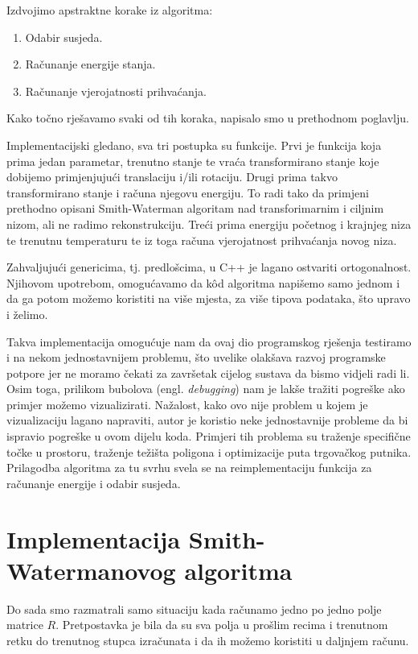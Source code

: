 \documentclass[times, utf8, zavrsni]{fer}
\begin{document}
Izdvojimo apstraktne korake iz algoritma:
\begin{enumerate}
\item 
Odabir susjeda.

\item
Računanje energije stanja.

\item
Računanje vjerojatnosti prihvaćanja.
\end{enumerate}
Kako točno rješavamo svaki od tih koraka, napisalo smo u
prethodnom poglavlju. 

Implementacijski gledano, sva tri postupka su funkcije.
Prvi je funkcija koja prima jedan parametar, trenutno stanje
te vraća transformirano stanje koje dobijemo primjenjujući
translaciju i/ili rotaciju.
Drugi prima takvo transformirano stanje i računa njegovu
energiju. To radi tako da primjeni prethodno opisani
Smith-Waterman algoritam nad transforimarnim i ciljnim
nizom, ali ne radimo rekonstrukciju. 
Treći prima energiju početnog i krajnjeg niza te trenutnu
temperaturu te iz toga računa vjerojatnost prihvaćanja
novog niza. 

Zahvaljujući genericima, tj. predlošcima, u C++ je lagano
ostvariti ortogonalnost. Njihovom upotrebom, omogućavamo
da kôd algoritma napišemo samo jednom i da ga potom možemo
koristiti na više mjesta, za više tipova podataka,
što upravo i želimo. 

Takva implementacija omogućuje nam da ovaj dio programskog
rješenja testiramo i na nekom jednostavnijem problemu, što
uvelike olakšava razvoj programske potpore jer ne moramo
čekati za završetak cijelog sustava da bismo vidjeli radi li.
Osim toga, prilikom bubolova (engl. \textit{debugging}) nam
je lakše tražiti pogreške ako primjer možemo vizualizirati.
Nažalost, kako ovo nije problem u kojem je vizualizaciju
lagano napraviti, autor je koristio neke jednostavnije
probleme da bi ispravio pogreške u ovom dijelu koda. Primjeri
tih problema su traženje specifične točke u prostoru, 
traženje težišta poligona i optimizacije puta trgovačkog putnika. 
Prilagodba algoritma za tu svrhu svela se na reimplementaciju
funkcija za računanje energije i odabir susjeda. 


\section{Implementacija Smith-Watermanovog algoritma}
Do sada smo razmatrali samo situaciju kada računamo jedno
po jedno polje matrice $R$. Pretpostavka je bila da su 
sva polja u prošlim recima i trenutnom retku do trenutnog
stupca izračunata i da ih možemo koristiti u daljnjem
računu. 
\end{document}
